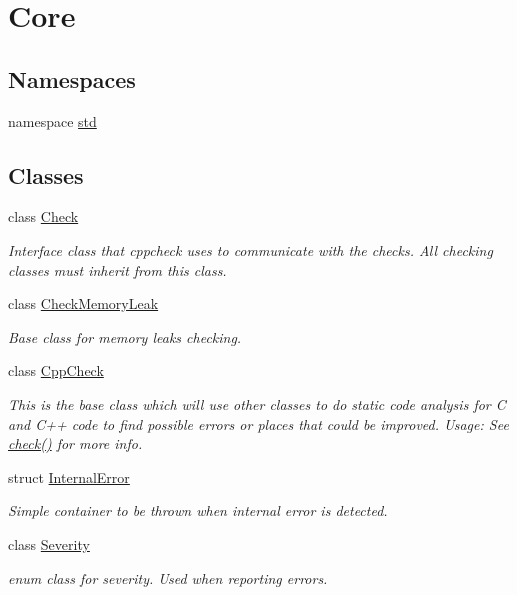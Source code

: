\hypertarget{group___core}{\section{Core}
\label{group___core}
}
\subsection*{Namespaces}
\begin{DoxyCompactItemize}
\item 
namespace \hyperlink{namespacestd}{std}
\end{DoxyCompactItemize}
\subsection*{Classes}
\begin{DoxyCompactItemize}
\item 
class \hyperlink{class_check}{Check}
\begin{DoxyCompactList}\small\item\em Interface class that cppcheck uses to communicate with the checks. All checking classes must inherit from this class. \end{DoxyCompactList}\item 
class \hyperlink{class_check_memory_leak}{Check\-Memory\-Leak}
\begin{DoxyCompactList}\small\item\em Base class for memory leaks checking. \end{DoxyCompactList}\item 
class \hyperlink{class_cpp_check}{Cpp\-Check}
\begin{DoxyCompactList}\small\item\em This is the base class which will use other classes to do static code analysis for C and C++ code to find possible errors or places that could be improved. Usage\-: See \hyperlink{class_cpp_check_abc81dee40c7f0c5f5ef353c2e4e46729}{check()} for more info. \end{DoxyCompactList}\item 
struct \hyperlink{struct_internal_error}{Internal\-Error}
\begin{DoxyCompactList}\small\item\em Simple container to be thrown when internal error is detected. \end{DoxyCompactList}\item 
class \hyperlink{class_severity}{Severity}
\begin{DoxyCompactList}\small\item\em enum class for severity. Used when reporting errors. \end{DoxyCompactList}\item 

\end{DoxyCompactItemize}
